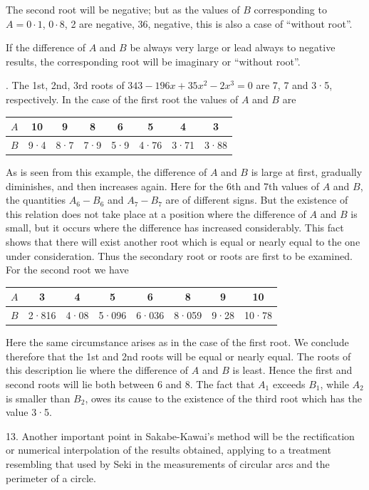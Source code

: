 \documentclass[11pt]{article}
\newcommand{\scanpage}[2]{\clearpage\setcounter{footnote}{0}\noindent{\footnotesize\color{gray}PDF page #1 · #2}\par\medskip}
\begin{document}
The second root will be negative; but as the values of $B$ corresponding to $A = 0{\cdot}1$, $0{\cdot}8$, 2 are negative, 36, negative, this is also a case of ``without root''.

If the difference of $A$ and $B$ be always very large or lead always to negative results, the corresponding root will be imaginary or ``without root''.

\scanpage{0280}{printed page 266}
12. The 1st, 2nd, 3rd roots of $343 - 196x + 35x^2 - 2x^3 = 0$ are 7, 7 and 3·5, respectively. In the case of the first root the values of $A$ and $B$ are
\begin{center}
\begin{tabular}{c|c|c|c|c|c|c|c}
$A$ & 10 & 9 & 8 & 6 & 5 & 4 & 3 \\
\hline
$B$ & 9·4 & 8·7 & 7·9 & 5·9 & 4·76 & 3·71 & 3·88
\end{tabular}
\end{center}

As is seen from this example, the difference of $A$ and $B$ is large at first, gradually diminishes, and then increases again. Here for the 6th and 7th values of $A$ and $B$, the quantities $A_6 - B_6$ and $A_7 - B_7$ are of different signs. But the existence of this relation does not take place at a position where the difference of $A$ and $B$ is small, but it occurs where the difference has increased considerably. This fact shows that there will exist another root which is equal or nearly equal to the one under consideration. Thus the secondary root or roots are first to be examined. For the second root we have
\begin{center}
\begin{tabular}{c|c|c|c|c|c|c|c}
$A$ & 3 & 4 & 5 & 6 & 8 & 9 & 10 \\
\hline
$B$ & 2·816 & 4·08 & 5·096 & 6·036 & 8·059 & 9·28 & 10·78
\end{tabular}
\end{center}
Here the same circumstance arises as in the case of the first root. We conclude therefore that the 1st and 2nd roots will be equal or nearly equal. The roots of this description lie where the difference of $A$ and $B$ is least. Hence the first and second roots will lie both between 6 and 8. The fact that $A_1$ exceeds $B_1$, while $A_2$ is smaller than $B_2$, owes its cause to the existence of the third root which has the value 3·5.

13. Another important point in Sakabe-Kawai's method will be the rectification or numerical interpolation of the results obtained, applying to a treatment resembling that used by Seki in the measurements of circular arcs and the perimeter of a circle.
\end{document}
